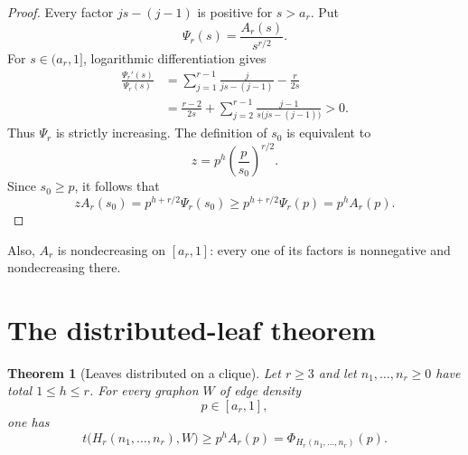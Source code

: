 \documentclass[11pt]{article}
\newtheorem{theorem}{Theorem}[section]
\begin{document}
\begin{proof}
Every factor $js-(j-1)$ is positive for $s>a_r$.  Put
\[
 \Psi_r(s)=\frac{A_r(s)}{s^{r/2}}.
\]
For $s\in(a_r,1]$, logarithmic differentiation gives
\begin{align*}
 \frac{\Psi_r'(s)}{\Psi_r(s)}
 &=\sum_{j=1}^{r-1}\frac{j}{js-(j-1)}-\frac{r}{2s}\\
 &=\frac{r-2}{2s}
   +\sum_{j=2}^{r-1}
      \frac{j-1}{s\bigl(js-(j-1)\bigr)}>0.
\end{align*}
Thus $\Psi_r$ is strictly increasing.  The definition of $s_0$ is
equivalent to
\[
 z=p^h\left(\frac p{s_0}\right)^{r/2}.
\]
Since $s_0\geq p$, it follows that
\[
 zA_r(s_0)
 =p^{h+r/2}\Psi_r(s_0)
 \geq p^{h+r/2}\Psi_r(p)
 =p^hA_r(p).
\]
\end{proof}

Also, $A_r$ is nondecreasing on $[a_r,1]$: every one of its factors is
nonnegative and nondecreasing there.


\section{The distributed-leaf theorem}

\begin{theorem}[Leaves distributed on a clique]
\label{thm:main}
Let $r\geq3$ and let $n_1,\ldots,n_r\geq0$ have total
$1\leq h\leq r$.  For every graphon $W$ of edge density
\[
 p\in[a_r,1],
\]
one has
\[
 \boxed{
 t\bigl(H_r(n_1,\ldots,n_r),W\bigr)
 \geq p^hA_r(p)
 =\Phi_{H_r(n_1,\ldots,n_r)}(p).
 }
\]
\end{theorem}
\end{document}
